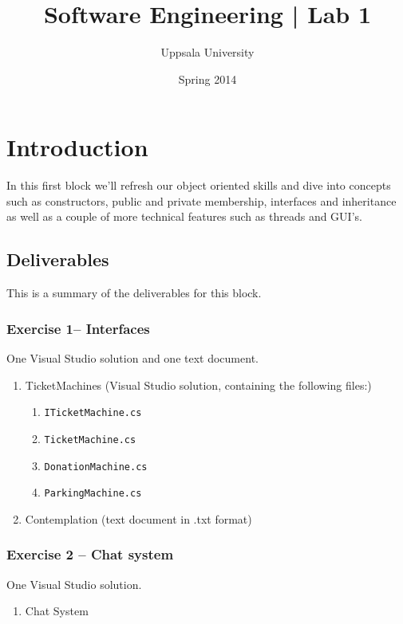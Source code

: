 \documentclass{article}
\begin{document}
  \title{ Software Engineering | Lab 1 }
  \author{ Uppsala University }
  \date{ Spring 2014 }
  \maketitle

  \lstset{language=[Sharp]C}







\section*{Introduction}
In this first block we'll refresh our object oriented skills and dive into concepts such as constructors, public and private membership, interfaces and inheritance as well as a couple of more technical features such as threads and GUI's.

\tableofcontents




\pagebreak
\subsection*{Deliverables}
This is a summary of the deliverables for this block.

\subsubsection*{Exercise 1-- Interfaces}
One Visual Studio solution and one text document.
\begin{enumerate}
  \item TicketMachines (Visual Studio solution, containing the following files:)
  \begin{enumerate}
    \item \texttt{ITicketMachine.cs}
    \item \texttt{TicketMachine.cs}
    \item \texttt{DonationMachine.cs}
    \item \texttt{ParkingMachine.cs}
  \end{enumerate}
  \item Contemplation (text document in .txt format)
\end{enumerate}

\subsubsection*{Exercise 2 -- Chat system}
One Visual Studio solution.
\begin{enumerate}
  \item Chat System
\end{enumerate}
\end{document}
